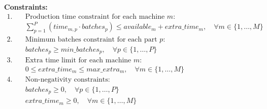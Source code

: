 \documentclass{article}
\begin{document}
\textbf{Constraints:}
\begin{align*}
1. & \quad \text{Production time constraint for each machine } m: \\
   & \quad \sum_{p=1}^{P} (time_{m,p} \cdot batches_{p}) \leq available_{m} + extra\_time_{m}, \quad \forall m \in \{1, \ldots, M\} \\
2. & \quad \text{Minimum batches constraint for each part } p: \\
   & \quad batches_{p} \geq min\_batches_{p}, \quad \forall p \in \{1, \ldots, P\} \\
3. & \quad \text{Extra time limit for each machine } m: \\
   & \quad 0 \leq extra\_time_{m} \leq max\_extra_{m}, \quad \forall m \in \{1, \ldots, M\} \\
4. & \quad \text{Non-negativity constraints:} \\
   & \quad batches_{p} \geq 0, \quad \forall p \in \{1, \ldots, P\} \\
   & \quad extra\_time_{m} \geq 0, \quad \forall m \in \{1, \ldots, M\}
\end{align*}
\end{document}
